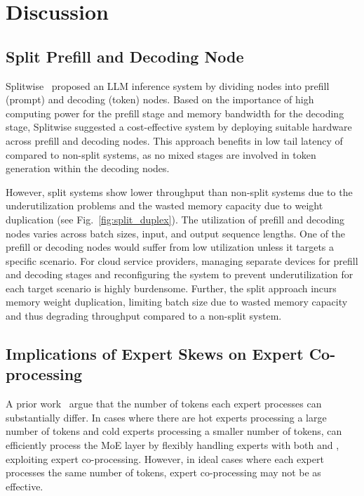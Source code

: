 \section{Discussion}
\label{sec:discussion}

\subsection{Split Prefill and Decoding Node}
\label{sec:discussion:splitwise}

Splitwise~\cite{isca-2024-splitwise} proposed an LLM inference system by dividing nodes into prefill (prompt) and decoding (token) nodes. 
Based on the importance of high computing power for the prefill stage and memory bandwidth for the decoding stage, Splitwise suggested a cost-effective system by deploying suitable hardware across prefill and decoding nodes. 
This approach benefits in low tail latency of \tbt compared to non-split systems, as no mixed stages are involved in token generation within the decoding nodes.

However, split systems show lower throughput than non-split systems due to the underutilization problems and the wasted memory capacity due to weight duplication (see Fig.~\ref{fig:split_duplex}).
The utilization of prefill and decoding nodes varies across batch sizes, input, and output sequence lengths. 
One of the prefill or decoding nodes would suffer from low utilization unless it targets a specific scenario. 
For cloud service providers, managing separate devices for prefill and decoding stages and reconfiguring the system to prevent underutilization for each target scenario is highly burdensome. 
Further, the split approach incurs memory weight duplication, limiting batch size due to wasted memory capacity and thus degrading throughput compared to a non-split system.

\subsection{Implications of Expert Skews on Expert Co-processing}
\label{sec:discussion:expert_distribution}
A prior work~\cite{2023-arxiv-moe-skew} argue that the number of tokens each expert processes can substantially differ. 
In cases where there are hot experts processing a large number of tokens and cold experts processing a smaller number of tokens, \duplex can efficiently process the MoE layer by flexibly handling experts with both \highp and \lowp, exploiting expert co-processing. 
However, in ideal cases where each expert processes the same number of tokens, expert co-processing may not be as effective.

